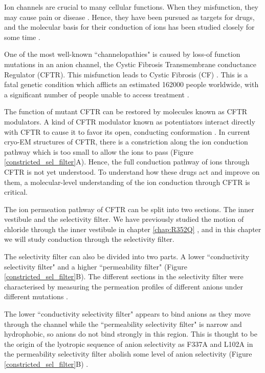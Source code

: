 Ion channels are crucial to many cellular functions. When they misfunction, they may cause pain or disease \cite{kingwell2019, kim2014}. Hence, they have been pursued as targets for drugs, and the molecular basis for their conduction of ions has been studied closely for some time \cite{santos2017, doyle1998, roux1993}.

One of the most well-known ``channelopathies" is caused by loss-of function mutations in an anion channel, the Cystic Fibrosis Transmembrane conductance Regulator (CFTR). This misfunction leads to Cystic Fibrosis (CF) \cite{riordan1989,gadsby2006}. This is a fatal genetic condition which afflicts an estimated 162000 people worldwide, with a significant number of people unable to access treatment \cite{guo2022}.

The function of mutant CFTR can be restored by molecules known as CFTR modulators. A kind of CFTR modulator known as potentiators interact directly with CFTR to cause it to favor its open, conducting conformation \cite{liu2019}. In current cryo-EM structures of CFTR, there is a constriction along the ion conduction pathway which is too small to allow the ions to pass \cite{zhang2018} (Figure \ref{constricted_sel_filter}A). Hence, the full conduction pathway of ions through CFTR is not yet understood. To understand how these drugs act and improve on them, a molecular-level understanding of the ion conduction through CFTR is critical.

The ion permeation pathway of CFTR can be split into two sections. The inner vestibule and the selectivity filter. We have previously studied the motion of chloride through the inner vestibule in chapter \ref{chap:R352Q} \cite{wong2022a}, and in this chapter we will study conduction through the selectivity filter.

The selectivity filter can also be divided into two parts. A lower ``conductivity selectivity filter" and a higher ``permeability filter" (Figure \ref{constricted_sel_filter}B). The different sections in the selectivity filter were characterised by measuring the permeation profiles of different anions under different mutations \cite{linsdell2016}. 

The lower ``conductivity selectivity filter" appears to bind anions as they move through the channel while the ``permeability selectivity filter" is narrow and hydrophobic, so anions do not bind strongly in this region. This is thought to be the origin of the lyotropic sequence of anion selectivity as F337A and L102A in the permeability selectivity filter abolish some level of anion selectivity (Figure \ref{constricted_sel_filter}B) \cite{linsdell2021}. 

